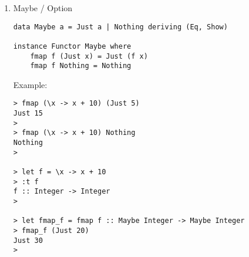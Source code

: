 \documentclass[11pt]{article}
\begin{document}
\begin{enumerate}
\begin{verbatim}
> map (\x -> x + 3) [1, 2, 3]
[4,5,6]
> fmap (\x -> x + 3) [1, 2, 3]
[4,5,6]
> 

> let f = fmap (\x -> x + 3) :: [Int] -> [Int]
> :t f
f :: [Int] -> [Int]

> f [1, 2, 3, 4]
[4,5,6,7]
>
\end{verbatim}


Alternative Implementation of list functor:

\begin{verbatim}
-- File: list_functor.hs 
--

data List a  = Cons a (List a)  | Nil 
  deriving (Show, Eq)

           
instance Functor List where
  
  fmap f xss = case xss of
               Nil          -> Nil
               Cons x xs    -> Cons (f x) (fmap f xs)


-- End of file -------------
---------------------------

> :load /tmp/list_functor.hs

> Cons 10 (Cons 20 (Cons 30 Nil))
Cons 10 (Cons 20 (Cons 30 Nil))
> 

> let xs = Cons 10 (Cons 20 (Cons 30 Nil))
> xs
Cons 10 (Cons 20 (Cons 30 Nil))
> :t xs
xs :: List Integer
> 

> fmap (\x -> x + 5) xs 
Cons 15 (Cons 25 (Cons 35 Nil))
> 

> let fm = fmap (\x -> x + 5) :: List Integer -> List Integer

> fm  xs
Cons 15 (Cons 25 (Cons 35 Nil))
>
\end{verbatim}

\item Maybe / Option
\label{sec-1-12-3-3}

\begin{verbatim}
data Maybe a = Just a | Nothing deriving (Eq, Show)

instance Functor Maybe where  
    fmap f (Just x) = Just (f x)  
    fmap f Nothing = Nothing
\end{verbatim}

Example: 

\begin{verbatim}
> fmap (\x -> x + 10) (Just 5)
Just 15
> 
> fmap (\x -> x + 10) Nothing
Nothing
> 

> let f = \x -> x + 10
> :t f
f :: Integer -> Integer
> 

> let fmap_f = fmap f :: Maybe Integer -> Maybe Integer
> fmap_f (Just 20)
Just 30
> 


\end{verbatim}
\end{enumerate}
\end{document}
